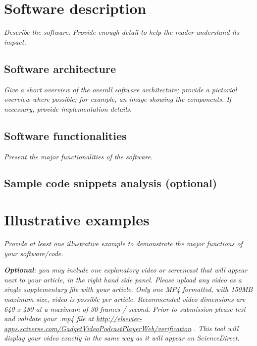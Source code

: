 \documentclass[preprint,12pt, a4paper]{elsarticle}
\begin{document}
\section{Software description}

\textit{Describe the software. Provide enough detail to help the reader understand its impact. }

\subsection{Software architecture}
\textit{  Give a short overview of the overall software architecture; provide a pictorial overview where possible; for example, an image showing the components. If necessary, provide implementation details.}

 \subsection{Software functionalities}
\textit{  Present the major functionalities of the software.}
  
 \subsection{Sample code snippets analysis (optional)}


\section{Illustrative examples}

\textit{Provide at least one illustrative example to demonstrate the major
functions of your software/code.}

\textit{\textbf{Optional}: you may include one explanatory  video or screencast that will appear next to your article, in the right hand side panel. Please upload any video as a single supplementary file with your article. Only one MP4 formatted, with 150MB maximum size, video is possible per article. Recommended video dimensions are 640 x 480 at a maximum of 30 frames / second. Prior to submission please test and validate your .mp4 file at  \url{http://elsevier-apps.sciverse.com/GadgetVideoPodcastPlayerWeb/verification} . This tool will display your video exactly in the same way as it will appear on ScienceDirect. }
\end{document}
